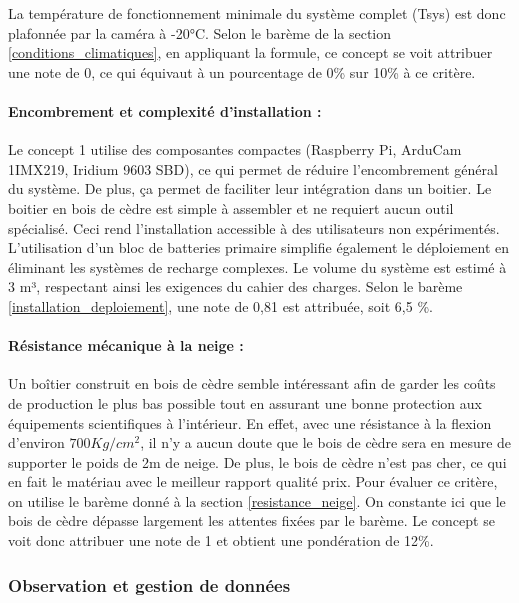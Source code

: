 \bigskip
La température de fonctionnement minimale du système complet (Tsys) est donc plafonnée par la caméra à -20°C. Selon le barème de la section \ref{conditions_climatiques}, en appliquant la formule, ce concept se voit attribuer une note de 0, ce qui équivaut à un pourcentage de 0\% sur 10\% à ce critère. 

\paragraph{Encombrement et complexité d'installation :}
\label{par:encombrement}
Le concept 1 utilise des composantes compactes (Raspberry Pi, ArduCam 1IMX219, Iridium 9603 SBD), ce qui permet de réduire l’encombrement général du système. De plus, ça permet de faciliter leur intégration dans un boitier. 
Le boitier en bois de cèdre est simple à assembler et ne requiert aucun outil spécialisé. Ceci rend l’installation accessible à des utilisateurs non expérimentés. L’utilisation d’un bloc de batteries primaire simplifie également le déploiement en éliminant les systèmes de recharge complexes. 
 Le volume du système est estimé à 3 m³, respectant ainsi les exigences du cahier des charges. Selon le barème \ref{installation_deploiement}, une note de 0,81 est attribuée, soit 6,5 \%. 

 
\paragraph{Résistance mécanique à la neige :}
\label{resistance_mecanique1}
Un boîtier construit en bois de cèdre semble intéressant afin de garder les coûts de production le plus bas possible tout en assurant une bonne protection 
aux équipements scientifiques à l'intérieur.
En effet, avec une résistance à la flexion d'environ $700 Kg/cm^2$, il n'y a aucun doute que le bois de cèdre sera en mesure de supporter le poids de 2m de neige.
De plus, le bois de cèdre n'est pas cher, ce qui en fait le matériau avec le meilleur rapport qualité prix.
Pour évaluer ce critère, on utilise le barème donné à la section \ref{resistance_neige}. On constante ici que le bois de cèdre dépasse largement les attentes fixées par le barème. 
Le concept se voit donc attribuer une note de 1 et obtient une pondération de 12\%.


\subsubsection{Observation et gestion de données}

